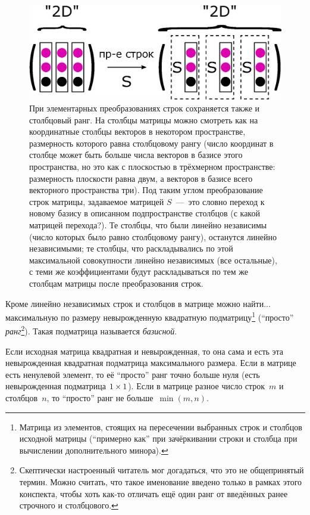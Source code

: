 \documentclass[a4paper,12pt]{article}
\begin{document}
    \begin{figure}[h]
      \centering
    
      \includegraphics[width=0.8\columnwidth]{elem-cols}
    
      \caption{При элементарных преобразованиях строк сохраняется также и столбцовый ранг. На столбцы матрицы можно смотреть как на координатные столбцы векторов в некотором пространстве, размерность которого равна столбцовому рангу (число координат в столбце может быть больше числа векторов в базисе этого пространства, но это как с плоскостью в трёхмерном пространстве: размерность плоскости равна двум, а векторов в базисе всего векторного пространства три). Под таким углом преобразование строк матрицы, задаваемое матрицей $S$~---~это словно переход к новому базису в описанном подпространстве столбцов (с какой матрицей перехода?). Те столбцы, что были линейно независимы (число которых было равно столбцовому рангу), останутся линейно независимыми; те столбцы, что раскладывались по этой максимальной совокупности линейно независимых (все остальные), с теми же коэффициентами будут раскладываться по тем же столбцам матрицы после преобразования строк.}
      \label{fig:elem-cols}
    \end{figure}
    
    Кроме линейно независимых строк и столбцов в матрице можно найти... максимальную по размеру невырожденную квадратную подматрицу\footnote{Матрица из элементов, стоящих на пересечении выбранных строк и столбцов исходной матрицы (``примерно как'' при зачёркивании строки и столбца при вычислении дополнительного минора).} (``просто'' \emph{ранг}\footnote{Скептически настроенный читатель мог догадаться, что это не общепринятый термин. Можно считать, что такое именование введено только в рамках этого конспекта, чтобы хоть как-то отличать ещё один ранг от введённых ранее строчного и столбцового.}).
    Такая подматрица называется \emph{базисной}.
    
    \begin{example}
      Если исходная матрица квадратная и невырожденная, то она сама и есть эта невырожденная квадратная подматрица максимального размера.
      Если в матрице есть ненулевой элемент, то её ``просто'' ранг точно больше нуля (есть невырожденная подматрица $1 \hm\times 1$).
      Если в матрице разное число строк~$m$ и столбцов~$n$, то ``просто'' ранг не больше~$\min{(m, n)}$.
    \end{example}
    
\end{document}
